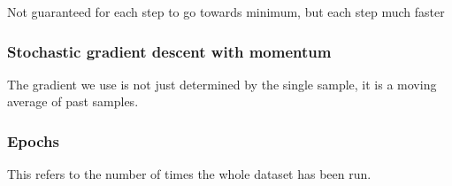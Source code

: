 Not guaranteed for each step to go towards minimum, but each step much faster

\subsubsection{Stochastic gradient descent with momentum}

The gradient we use is not just determined by the single sample, it is a moving average of past samples.

\subsubsection{Epochs}

This refers to the number of times the whole dataset has been run.

